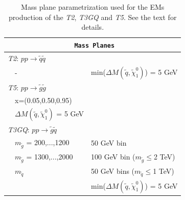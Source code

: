 \documentclass[preprint,number,sort&compress,twocolumn,3p]{elsstyarticle}
\newcommand{\TGQ}{ \textit{T3GQ}}
\newcommand{\Ttwo}{ \textit{T2}}
\newcommand{\Tfive}{ \textit{T5}}
\begin{document}
%
\begin{table}[!h]
	\footnotesize
	\begin{center}
		\renewcommand{\arraystretch}{1.3}
		\begin{tabular}{ l l l }  \toprule \toprule 
			\multicolumn{3}{c}{\texttt{ \normalsize \textbf{Mass Planes}}} \\ \toprule \toprule
			\multicolumn{3}{l}{\Ttwo: $p p \rightarrow \tilde q \tilde q$} \\
			& - & min($\Delta M(\tilde q, \tilde \chi _1 ^0)$) = 5 GeV \\ \midrule
			\multicolumn{3}{l}{\Tfive: $p p \rightarrow \tilde g \tilde g$} \\ 
			&x=(0.05,0.50,0.95) &  \\ 
			&$\Delta M(\tilde q, \tilde \chi _1 ^0)$ = 5 GeV&  \\ \midrule
			\multicolumn{3}{l}{\TGQ: $p p \rightarrow \tilde g \tilde q$} \\  
			& $m_{\tilde g}$ = 200,...,1200 & 50 GeV bin \\ 
			& $m_{\tilde g}$ = 1300,...,2000 & 100 GeV bin ($m_{\tilde g}\leq$2 TeV) \\
			& $m_{\tilde q}$ & 50 GeV bins ($m_{\tilde q}\leq$1 TeV) \\
			& & min($\Delta M(\tilde q, \tilde \chi _1 ^0)$) = 5 GeV \\ \bottomrule \bottomrule
		\end{tabular}
	\end{center}
	\caption{Mass plane parametrization used for the EMs production of the \textit{T2}, \textit{T3GQ} and \textit{T5}. See the text for details.}
	\label{TGQ_Planes} 
\end{table}
%
\end{document}
